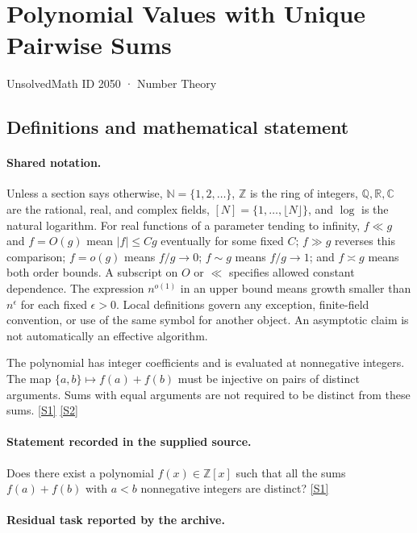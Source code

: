\documentclass[11pt,a4paper]{article}
\newcommand{\N}{\mathbb{N}}
\newcommand{\Z}{\mathbb{Z}}
\newcommand{\Q}{\mathbb{Q}}
\newcommand{\R}{\mathbb{R}}
\newcommand{\C}{\mathbb{C}}
\newcommand{\sref}[2]{\hyperlink{source:#1:#2}{[S#2]}}
\begin{document}

\setcounter{section}{2049}

\section{Polynomial Values with Unique Pairwise Sums}\label{2050}

{\small\sffamily UnsolvedMath ID 2050 · Number Theory}

\subsection{Definitions and mathematical statement}

\paragraph{Shared notation.}Unless a section says otherwise, $\N=\{1,2,\ldots\}$,
$\Z$ is the ring of integers, $\Q,\R,\C$ are the rational, real, and complex
fields, $[N]=\{1,\ldots,\lfloor N\rfloor\}$, and $\log$ is the natural
logarithm. For real functions of a parameter tending to infinity,
$f\ll g$ and $f=O(g)$ mean $|f|\leq Cg$ eventually for some fixed $C$;
$f\gg g$ reverses this comparison; $f=o(g)$ means $f/g\to0$;
$f\sim g$ means $f/g\to1$; and $f\asymp g$ means both order bounds.
A subscript on $O$ or $\ll$ specifies allowed constant dependence.
The expression $n^{o(1)}$ in an upper bound means growth smaller than
$n^\epsilon$ for each fixed $\epsilon>0$. Local definitions govern any
exception, finite-field convention, or use of the same symbol for another
object. An asymptotic claim is not automatically an effective algorithm.



The polynomial has integer coefficients and is evaluated at nonnegative integers. The map $\{a,b\}\mapsto f(a)+f(b)$ must be injective on pairs of distinct arguments. Sums with equal arguments are not required to be distinct from these sums. \sref{2050}{1} \sref{2050}{2}

\paragraph{Statement recorded in the supplied source.}
Does there exist a polynomial $f(x)\in\mathbb{Z}[x]$ such that all the sums $f(a)+f(b)$ with $a<b$ nonnegative integers are distinct? \sref{2050}{1}

\paragraph{Residual task reported by the archive.}
\end{document}
